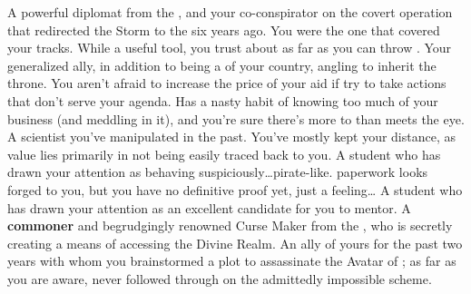 \documentclass[char]{GL2020}
\begin{document}
\begin{contacts}
    \contact{\cDiplomat{}} A powerful diplomat from the \pTech{}, and your co-conspirator on the covert operation that redirected the Storm to the \pShip{} six years ago. You were the one that covered your tracks. While \cDiplomat{\theyare} a useful tool, you trust \cDiplomat{\them} about as far as you can throw \cDiplomat{\them}.
    \contact{\cPrince{}} Your generalized ally, in addition to being a \cPrince{\Heir} of your country, angling to inherit the throne. You aren’t afraid to increase the price of your aid if \cPrince{\they} try to take actions that don’t serve your agenda.
    \contact{\cInterpol{}} Has a nasty habit of knowing too much of your business (and meddling in it), and you're sure there's more to \cInterpol{\them} than meets the eye.
    \contact{\cHeadScientist{}} A scientist you've manipulated in the past. You've mostly kept your distance, as \cHeadScientist{\their} value lies primarily in \cHeadScientist{\them} not being easily traced back to you.
    \contact{\cPirateChild{}} A student who has drawn your attention as behaving suspiciously\ldots pirate-like. \cPirateChild{\Their} paperwork looks forged to you, but you have no definitive proof yet, just a feeling\ldots
     \contact{\cLibAssist{}} A student who has drawn your attention as an excellent candidate for you to mentor.
    \contact{\cCurse{}} A \textbf{commoner} and begrudgingly renowned Curse Maker from the \pFarm{}, who is secretly creating a means of accessing the Divine Realm.
    \contact{\cAntiChup{}} An ally of yours for the past two years with whom you brainstormed a plot to assassinate the Avatar of \cEbb{}; as far as you are aware, \cAntiChup{\they} never followed through on the admittedly impossible scheme.

\end{contacts}
\end{document}
